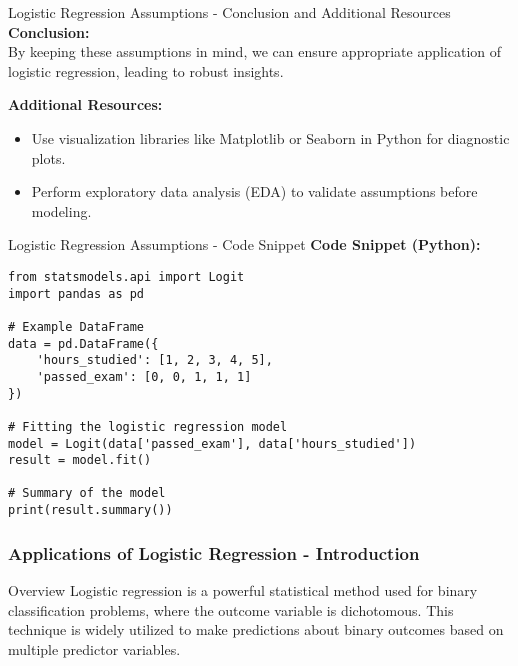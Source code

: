 \documentclass[aspectratio=169]{beamer}
\begin{document}
\begin{frame}[fragile]{Logistic Regression Assumptions - Conclusion and Additional Resources}
  \textbf{Conclusion:} \\
  By keeping these assumptions in mind, we can ensure appropriate application of logistic regression, leading to robust insights.

  \textbf{Additional Resources:} 
  \begin{itemize}
    \item Use visualization libraries like Matplotlib or Seaborn in Python for diagnostic plots.
    \item Perform exploratory data analysis (EDA) to validate assumptions before modeling.
  \end{itemize}
\end{frame}

\begin{frame}[fragile]{Logistic Regression Assumptions - Code Snippet}
  \textbf{Code Snippet (Python):} 
  \begin{lstlisting}
from statsmodels.api import Logit
import pandas as pd

# Example DataFrame
data = pd.DataFrame({
    'hours_studied': [1, 2, 3, 4, 5],
    'passed_exam': [0, 0, 1, 1, 1]
})

# Fitting the logistic regression model
model = Logit(data['passed_exam'], data['hours_studied'])
result = model.fit()

# Summary of the model
print(result.summary())
  \end{lstlisting}
\end{frame}

\begin{frame}[fragile]
    \frametitle{Applications of Logistic Regression - Introduction}
    \begin{block}{Overview}
        Logistic regression is a powerful statistical method used for binary classification problems, 
        where the outcome variable is dichotomous. 
        This technique is widely utilized to make predictions about binary outcomes based on multiple predictor variables.
    \end{block}
\end{frame}
\end{document}
